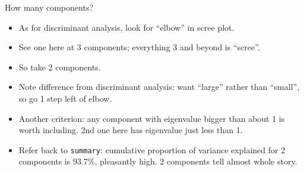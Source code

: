 \documentclass[unknownkeysallowed]{beamer}\usepackage[]{graphicx}\usepackage[]{color}
\makeatletter
\newcommand{\hlopt}[1]{\textcolor[rgb]{0,0,0}{#1}}%
\newcommand{\hlstd}[1]{\textcolor[rgb]{0.345,0.345,0.345}{#1}}%
\newenvironment{kframe}{%
 \def\at@end@of@kframe{}%
 \ifinner\ifhmode%
  \def\at@end@of@kframe{\end{minipage}}%
  \begin{minipage}{\columnwidth}%
 \fi\fi%
 \def\FrameCommand##1{\hskip\@totalleftmargin \hskip-\fboxsep
 \colorbox{shadecolor}{##1}\hskip-\fboxsep
     \hskip-\linewidth \hskip-\@totalleftmargin \hskip\columnwidth}%
 \MakeFramed {\advance\hsize-\width
   \@totalleftmargin\z@ \linewidth\hsize
   \@setminipage}}%
 {\par\unskip\endMakeFramed%
 \at@end@of@kframe}
\newenvironment{knitrout}{}{} %
\makeatother
\begin{document}
\begin{frame}[fragile]{How many components?}
  
  \begin{itemize}
  \item As for discriminant analysis, look for ``elbow'' in scree plot.
  \item See one here at 3 components; everything 3 and beyond is ``scree''.
  \item So take 2 components.
  \item Note difference from discriminant analysis: want ``large''
    rather than ``small'', so go 1 step left of elbow.
  \item Another criterion: any component with eigenvalue bigger than
    about 1 is worth including. 2nd one here has eigenvalue just less
    than 1.
  \item Refer back to \texttt{summary}: cumulative proportion of
    variance explained for 2 components is 93.7\%, pleasantly high. 2
    components tell almost whole story.
  \end{itemize}
  
\end{frame}

\end{document}
